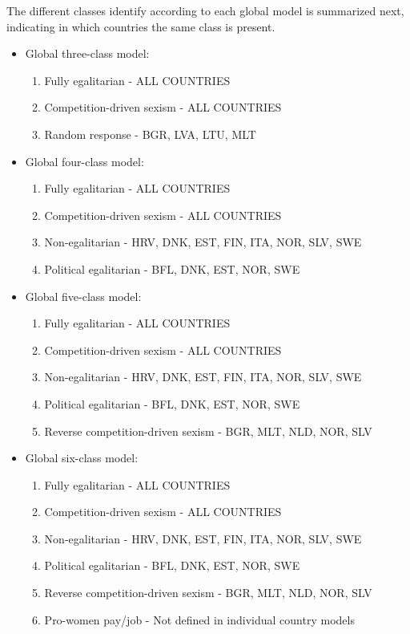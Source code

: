 \documentclass[12pt,a4paper,oneside]{reedthesis}
\providecommand{\tightlist}{%
  \setlength{\itemsep}{0pt}\setlength{\parskip}{0pt}}
\begin{document}
The different classes identify according to each global model is summarized next, indicating in which countries the same class is present.
\begin{itemize}
\tightlist
\item
  Global three-class model:
  \begin{enumerate}
  \def\labelenumi{\arabic{enumi}.}
  \tightlist
  \item
    Fully egalitarian - ALL COUNTRIES
  \item
    Competition-driven sexism - ALL COUNTRIES
  \item
    Random response - BGR, LVA, LTU, MLT
  \end{enumerate}
\item
  Global four-class model:
  \begin{enumerate}
  \def\labelenumi{\arabic{enumi}.}
  \tightlist
  \item
    Fully egalitarian - ALL COUNTRIES
  \item
    Competition-driven sexism - ALL COUNTRIES
  \item
    Non-egalitarian - HRV, DNK, EST, FIN, ITA, NOR, SLV, SWE
  \item
    Political egalitarian - BFL, DNK, EST, NOR, SWE
  \end{enumerate}
\item
  Global five-class model:
  \begin{enumerate}
  \def\labelenumi{\arabic{enumi}.}
  \tightlist
  \item
    Fully egalitarian - ALL COUNTRIES
  \item
    Competition-driven sexism - ALL COUNTRIES
  \item
    Non-egalitarian - HRV, DNK, EST, FIN, ITA, NOR, SLV, SWE
  \item
    Political egalitarian - BFL, DNK, EST, NOR, SWE
  \item
    Reverse competition-driven sexism - BGR, MLT, NLD, NOR, SLV
  \end{enumerate}
\item
  Global six-class model:
  \begin{enumerate}
  \def\labelenumi{\arabic{enumi}.}
  \tightlist
  \item
    Fully egalitarian - ALL COUNTRIES
  \item
    Competition-driven sexism - ALL COUNTRIES
  \item
    Non-egalitarian - HRV, DNK, EST, FIN, ITA, NOR, SLV, SWE
  \item
    Political egalitarian - BFL, DNK, EST, NOR, SWE
  \item
    Reverse competition-driven sexism - BGR, MLT, NLD, NOR, SLV
  \item
    Pro-women pay/job - Not defined in individual country models
  \end{enumerate}
\end{itemize}
\end{document}

